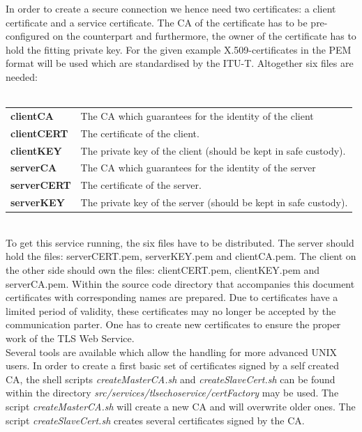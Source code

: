 In order to create a secure connection we hence need two certificates: a client certificate and a service certificate.
The CA of the certificate has to be pre-configured on the counterpart and furthermore, the owner of the certificate has to hold the fitting private key.
For the given example X.509-certificates in the PEM format will be used which are standardised by the ITU-T.
Altogether six files are needed:\\
\\
\begin{tabular}{l@{~---~}p{13cm}}
\textbf{clientCA}   & The CA which guarantees for the identity of the client \\
\textbf{clientCERT} & The certificate of the client. \\
\textbf{clientKEY}  & The private key of the client (should be kept in safe custody).\vspace{2ex}\\
\textbf{serverCA}   & The CA which guarantees for the identity of the server \\
\textbf{serverCERT} & The certificate of the server. \\
\textbf{serverKEY}  & The private key of the server (should be kept in safe custody).\\
\end{tabular}
\forcelinebreak
\\






To get this service running, the six files have to be distributed. The server should hold the files: serverCERT.pem, serverKEY.pem and clientCA.pem. The client on the other side should own the files: clientCERT.pem, clientKEY.pem and serverCA.pem.
Within the source code directory that accompanies this document certificates with corresponding names are prepared. Due to certificates have a limited period of validity, these certificates may no longer be accepted by the communication parter.
One has to create new certificates to ensure the proper work of the TLS Web Service.\\


Several tools are available which allow the handling for more advanced UNIX users. In order to create a first basic set of certificates signed by a self created CA, the shell scripts \textit{createMasterCA.sh} and \textit{createSlaveCert.sh} can  be found within the directory \textit{src/services/tlsechoservice/certFactory} may be used. The script \textit{createMasterCA.sh} will create a new CA and will overwrite older ones. The script \textit{createSlaveCert.sh} creates several certificates signed by the CA.\\


